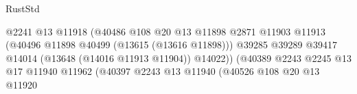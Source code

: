 \begin{lexlean}{RustStd}
\begin{coremodule}
                                                              @2241
                                                              @13
                                                              @11918
                                                              (@40486
                                                                @108
                                                                @20
                                                                @13
                                                                @11898
                                                                @2871
                                                                @11903
                                                                @11913
                                                                (@40496
                                                                  @11898
                                                                  @40499
                                                                  (@13615 (@13616 @11898)))
                                                                @39285
                                                                @39289
                                                                @39417
                                                                @14014
                                                                (@13648 (@14016 @11913 @11904))
                                                                @14022))
                                                            (@40389
                                                              @2243
                                                              @2245
                                                              @13
                                                              @17
                                                              @11940
                                                              @11962
                                                              (@40397
                                                                @2243
                                                                @13
                                                                @11940
                                                                (@40526
                                                                  @108
                                                                  @20
                                                                  @13
                                                                  @11920

\end{coremodule}
\end{lexlean}
